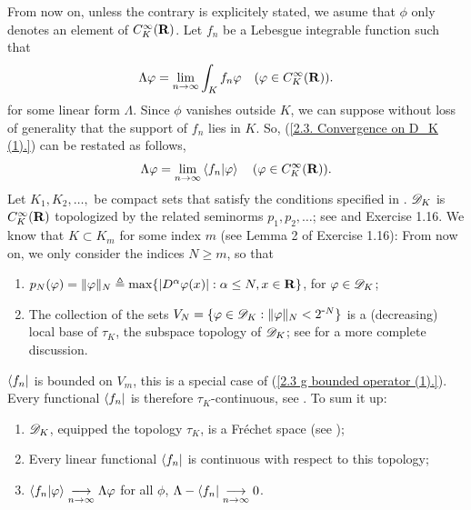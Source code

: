From now on, unless the contrary is explicitely stated, %
we asume that $\phi$ only denotes an element of $C_K^\infty({\mathbf R})$. 
Let $f_n$ be a Lebesgue integrable function such that %
%
  \begin{align}\label{2.3. Convergence on D_K (1).}
    \Lambda \varphi = \underset{n \to \infty}{\lim} 
      \int_{K} f_n\varphi 
      \quad (\varphi \in C_K^\infty({\mathbf R})).
  \end{align}
%
for some linear form $\Lambda$. %
%
Since $\phi$ vanishes outside $K$, we can suppose without loss of generality %
that the support of $f_n$ lies in $K$. So, %
%
  (\ref{2.3. Convergence on D_K (1).}) %
% 
can be restated as follows, 
%
  \begin{align}
    \Lambda \varphi = \underset{n \to \infty}{\lim} 
      \bra{f_n}\ket{\varphi} 
      \quad (\varphi \in C_K^\infty({\mathbf R})).
  \end{align}
%
Let $K_1, K_2, \dots, $ be compact sets that satisfy the conditions 
specified in . %
${\mathscr D}_K$ is $C_K^\infty({\mathbf R})$ topologized by the related seminorms %
%
  $p_1, p_2, \dots$; see  and Exercise 1.16.
%
We know that $K\subset K_m$ for some index $m$ %
(see Lemma 2 of Exercise 1.16): From now on, we only consider the indices 
$N \geq m$, so that%
%
  \renewcommand{\labelenumi}{(\alph{enumi})}%
  \begin{enumerate}
    \item{
      $p_N(\varphi) = \| \varphi \|_N \triangleq \max 
      \{\lvert D^{\alpha}\varphi(x) \rvert: \alpha \leq N, x \in {\mathbf R}\}$, %
      for $\varphi \in {\mathscr D}_K$;
    }
    \item{
      The collection of the sets %
      $V_N = \{ \varphi \in {\mathscr D}_K:  \| \varphi \|_N < 2^{\text{\small{-}} N}\}$ %
      is a (decreasing) local base of $\tau_K$, the subspace topology of ${\mathscr D}_K$; %
      see  for a more complete discussion.
    }
  \end{enumerate}
  \renewcommand{\labelenumi}{(\roman{enumi})}
%
$\bra{f_n}$ is bounded on $V_m$, this is a special case of %
%
  (\ref{2.3  g  bounded operator (1).}). %
%
Every functional $\bra{f_n}$ is therefore $\tau_K$-continuous, see %
%
  .
%
To sum it up: %
%
  \begin{enumerate}
    \item{${\mathscr D}_K$, equipped the topology $\tau_K$, is a Fréchet space %
      (see )};
    \item{Every linear functional $\bra{f_n}$ is continuous %
      with respect to this topology;}
    \item{
      $\bra{f_n}\ket{\varphi} \underset{n\to\infty}{\longrightarrow} \Lambda \varphi$ for all $\phi$, 
        \ie 
      $ \Lambda-\bra{f_n} \underset{n\to\infty}{\longrightarrow}0$.
    }
  \end{enumerate}

